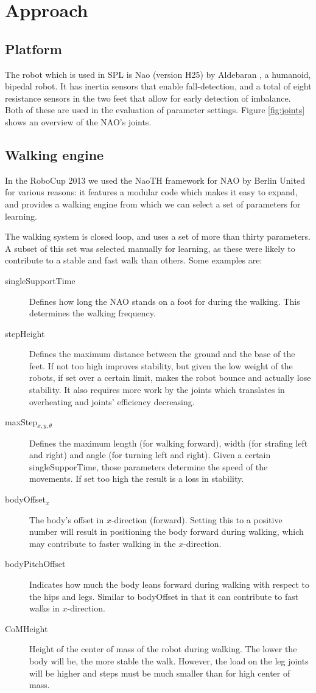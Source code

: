 \documentclass{article}
\begin{document}
\section{Approach}
\subsection{Platform}
The robot which is used in SPL is Nao (version H25) by Aldebaran \citep{gouaillier2009mechatronic}, a humanoid, bipedal robot. It has inertia sensors that enable fall-detection, and a total of eight resistance sensors in the two feet that allow for early detection of imbalance. Both of these are used in the evaluation of parameter settings. Figure \ref{fig:joints} shows an overview of the NAO's joints.

\subsection{Walking engine}
In the RoboCup 2013 we used the NaoTH framework for NAO by Berlin United
\cite{naothdescription} for various reasons: it features a modular code which
makes it easy to expand, and provides a walking engine from which we can select
a set of parameters for learning. 

The walking system is closed loop, and uses a set of more than thirty parameters. A subset of this set was selected manually for learning, as these were likely to contribute to a stable and fast walk than others.
Some examples are:
\begin{description}
\item[singleSupportTime] Defines how long the NAO stands on a foot for during the walking. This determines the walking frequency.
\item[stepHeight] Defines the maximum distance between the ground and the base of the feet. If not too high improves stability, but given the low weight of the robots, if set over a certain limit, makes the robot bounce and actually lose stability. It also requires more work by the joints which translates in overheating and joints' efficiency decreasing. 
\item[maxStep$_{x,y, \theta }$] Defines the maximum length (for walking forward), width (for strafing left and right) and angle (for turning left and right). Given a certain singleSupporTime, those parameters determine the speed of the movements. If set too high the result is a loss in stability.
\item[bodyOffset$_{x}$] The body's offset in $x$-direction (forward). Setting this to a positive number will result in positioning the body forward during walking, which may contribute to faster walking in the $x$-direction.
\item[bodyPitchOffset] Indicates how much the body leans forward during walking with respect to the hips and legs. Similar to bodyOffset in that it can contribute to fast walks in $x$-direction. 
\item[CoMHeight] Height of the center of mass of the robot during walking. The lower the body will be, the more stable the walk. However, the load on the leg joints will be higher and steps must be much smaller than for high center of mass. 
\end{description}
\end{document}
